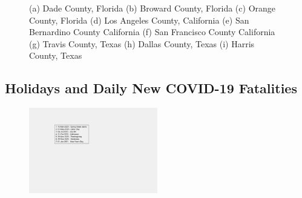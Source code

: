 \documentclass[]{article}
\begin{document}
\begin{figure}
	\caption{(a) Dade County, Florida (b) Broward County, Florida (c) Orange County, Florida (d) Los Angeles County, California (e) San Bernardino County California (f) San Francisco County California (g) Travis County, Texas (h) Dallas County, Texas (i) Harris County, Texas}
	\label{fig:foobar}
\end{figure}

\FloatBarrier
\vspace{5mm}

\subsection{Holidays and Daily New COVID-19 Fatalities}

\begin{figure}[!h]
	\centering
	\includegraphics[width=0.50\textwidth]{legends/holiday_legend.png}
	\caption{}
	\label{fig:legends/holiday_legendLabel}
\end{figure}
\end{document}
